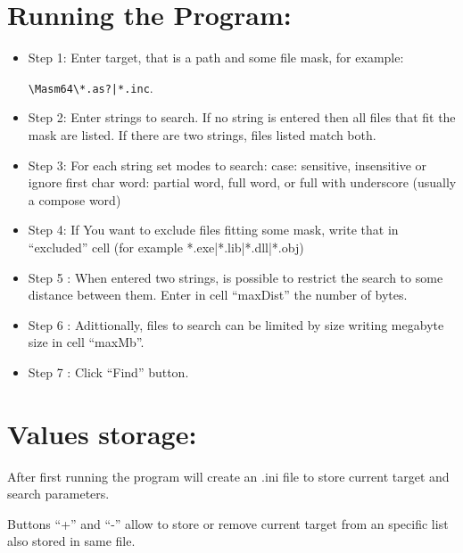 \documentclass[11pt,a4paper]{scrartcl}
\begin{document}
\title{\color{myblue}{LookingFor }}
\subtitle{\color{myblue}{A Masm64 tool to find strings in files}}

\author{Héctor S. Enrique}
\date{ april 30, 2024}
\maketitle

\section{Running the Program: }

    \begin{itemize}
        \item Step 1: Enter target, that is a path and some file mask, for example:
         
        \hspace{4cm} \verb$\Masm64\*.as?|*.inc$. 
        
        \item Step 2: Enter strings to search. If no string is entered then all files that fit the mask are listed. If there are two strings, files listed match both.
        \item Step 3: For each string set modes to search:
	 \subitem case: sensitive, insensitive or ignore first char
	 \subitem word: partial word, full word, or full with underscore (usually a compose word) 
        \item Step 4:  If You want to exclude files fitting some mask, write that in ``excluded'' cell (for example *.exe|*.lib|*.dll|*.obj)
        \item Step 5 : When entered two strings, is possible to restrict the search to some distance between them. Enter in cell ``maxDist'' the number of bytes.
        \item Step 6 : Adittionally, files to search can be limited by size writing megabyte size in cell ``maxMb''.
        \item Step 7 : Click ``Find'' button.
     \end{itemize}

\section{Values storage: }

	After first running the program will create an .ini file to store current target and search parameters.
	
	Buttons ``+'' and ``-'' allow to store or remove current target from an specific list also stored in same file. 
\end{document}
